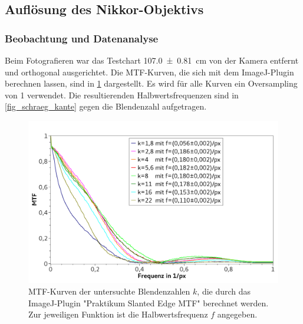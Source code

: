\documentclass[
	a4paper,
	12pt,
	pagesize,
	ngerman
]{scrartcl}
\begin{document}
	\subsection{Auflösung des Nikkor-Objektivs}
	\subsubsection{Beobachtung und Datenanalyse}
	
	Beim Fotografieren war das Testchart \SI{107,0+-0,81}{cm} von der Kamera entfernt und orthogonal ausgerichtet.
	Die MTF-Kurven, die sich mit dem ImageJ-Plugin berechnen lassen, sind in \cref{fig_schraeg_kante_mtf} dargestellt. 
	Es wird für alle Kurven ein Oversampling von 1 verwendet.
	Die resultierenden Halbwertsfrequenzen sind in \cref{fig_schraeg_kante} gegen die Blendenzahl aufgetragen.

	\begin{figure}[H]  
		\includegraphics[width=1\textwidth]{fig_schraeg_kant_mtf}
		\centering
		\caption{
			MTF-Kurven der untersuchte Blendenzahlen $k$, die durch das ImageJ-Plugin "Praktikum Slanted Edge MTF" berechnet werden.
			Zur jeweiligen Funktion ist die Halbwertsfrequenz $f$ angegeben.
			}
		\label{fig_schraeg_kante_mtf}
		\centering
	\end{figure}
\end{document}
